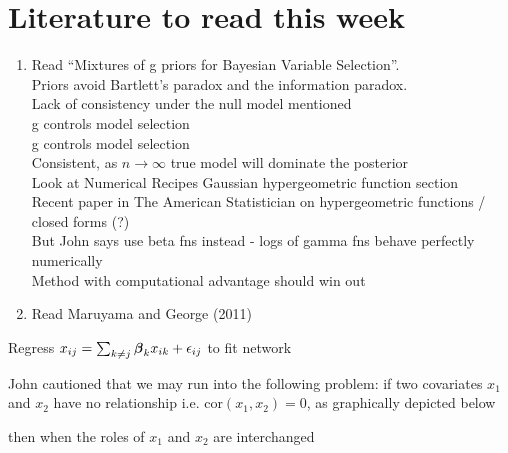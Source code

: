 \documentclass{amsart}
\begin{document}
\section{Literature to read this week}
\begin{enumerate}
\item Read ``Mixtures of g priors for Bayesian Variable Selection''. \\
Priors avoid Bartlett's paradox and the information paradox. \\
Lack of consistency under the null model mentioned \\
g controls model selection \\
g controls model selection \\
Consistent, as $n \to \infty$ true model will dominate the posterior \\
Look at Numerical Recipes Gaussian hypergeometric function section \\
Recent paper in The American Statistician on hypergeometric functions / closed forms (?) \\
But John says use beta fns instead - logs of gamma fns behave perfectly numerically \\
Method with computational advantage should win out \\

\item Read Maruyama and George (2011)
\end{enumerate}

Regress $x_{ij} = \sum_{k \ne j} {\boldsymbol \beta}_k x_{ik} + \epsilon_{ij}$ to fit network

John cautioned that we may run into the following problem: if two covariates $x_1$ and $x_2$ have
no relationship i.e. $\text{cor}(x_1, x_2) = 0$, as graphically depicted below


then when the roles of $x_1$ and $x_2$ are interchanged

\end{document}
